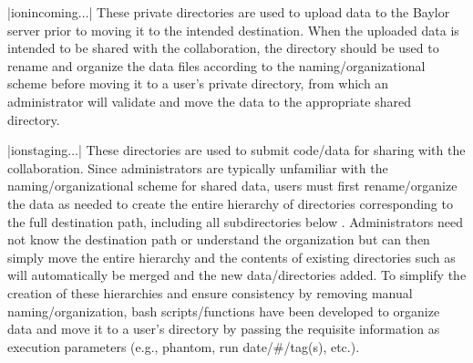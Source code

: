 \begin{tcbenvironment}
\begin{tcbparbox}
\end{tcbparbox}
\begin{tcbparbox}|\dirsep ion\dirsep incoming\dirsep{}\dirsep$\dots$|
\bfdash These private directories are used to upload data to the Baylor server prior to moving it to the intended destination.  When the uploaded data is intended to be shared with the collaboration, the directory should be used to rename and organize the data files according to the naming/organizational scheme before moving it to a user's private  directory, from which an administrator will validate and move the data to the appropriate shared directory.
\end{tcbparbox}
\begin{tcbparbox}|\dirsep ion\dirsep staging\dirsep{}\dirsep$\dots$|
\bfdash These directories are used to submit code/data for sharing with the collaboration.  Since administrators are typically unfamiliar with the naming/organizational scheme for shared data, users must first rename/organize the data as needed to create the entire hierarchy of directories corresponding to the full destination path, including all subdirectories below .  Administrators need not know the destination path or understand the organization but can then simply move the entire hierarchy and the contents of existing directories such as  will automatically be merged and the new data/directories added.  To simplify the creation of these hierarchies and ensure consistency by removing manual naming/organization, bash scripts/functions have been developed to organize data and move it to a user's  directory by passing the requisite information as execution parameters (e.g., phantom, run date/\#/tag(s), etc.).\\[\tcbparskip]

\end{tcbparbox}
\end{tcbenvironment}
